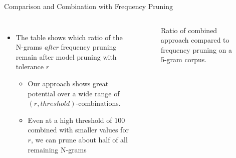 \documentclass[16:9,en,navbarinfooter]{sdqbeamer}
\begin{document}
\begin{frame}[fragile]{Comparison and Combination with Frequency Pruning}
\vspace{1cm}
\begin{columns}
    \begin{itemize}
        \item The table shows which ratio of the N-grams \emph{after} frequency pruning
            remain after model pruning with tolerance $r$
        \begin{itemize}
            \item Our approach shows great potential over a wide range of
                $(r,threshold)$-combinations.
            \item Even at a high threshold of $100$ combined with smaller values for $r$, we
                can prune about half of all remaining N-grams
        \end{itemize}
    \end{itemize}
       \begin{figure}[H]
       \centering%
       
       \caption*{Ratio of combined approach compared to frequency pruning on a 5-gram corpus.} 
       \end{figure}
\end{columns}
\end{frame}
\end{document}
